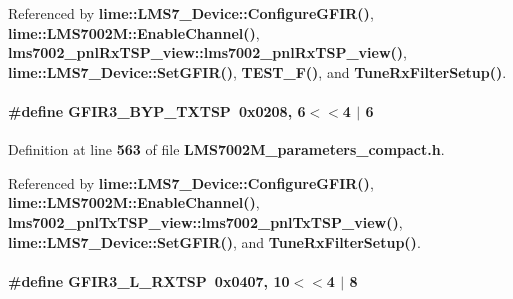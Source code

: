 Referenced by {\bf lime\+::\+L\+M\+S7\+\_\+\+Device\+::\+Configure\+G\+F\+I\+R()}, {\bf lime\+::\+L\+M\+S7002\+M\+::\+Enable\+Channel()}, {\bf lms7002\+\_\+pnl\+Rx\+T\+S\+P\+\_\+view\+::lms7002\+\_\+pnl\+Rx\+T\+S\+P\+\_\+view()}, {\bf lime\+::\+L\+M\+S7\+\_\+\+Device\+::\+Set\+G\+F\+I\+R()}, {\bf T\+E\+S\+T\+\_\+\+F()}, and {\bf Tune\+Rx\+Filter\+Setup()}.

\paragraph[{G\+F\+I\+R3\+\_\+\+B\+Y\+P\+\_\+\+T\+X\+T\+SP}]{\setlength{\rightskip}{0pt plus 5cm}\#define G\+F\+I\+R3\+\_\+\+B\+Y\+P\+\_\+\+T\+X\+T\+SP~0x0208, 6$<$$<$4 $\vert$  6}\label{LMS7002M__parameters__compact_8h_a7ed74a8da574ec9341faec31675d4859}


Definition at line {\bf 563} of file {\bf L\+M\+S7002\+M\+\_\+parameters\+\_\+compact.\+h}.



Referenced by {\bf lime\+::\+L\+M\+S7\+\_\+\+Device\+::\+Configure\+G\+F\+I\+R()}, {\bf lime\+::\+L\+M\+S7002\+M\+::\+Enable\+Channel()}, {\bf lms7002\+\_\+pnl\+Tx\+T\+S\+P\+\_\+view\+::lms7002\+\_\+pnl\+Tx\+T\+S\+P\+\_\+view()}, {\bf lime\+::\+L\+M\+S7\+\_\+\+Device\+::\+Set\+G\+F\+I\+R()}, and {\bf Tune\+Rx\+Filter\+Setup()}.

\paragraph[{G\+F\+I\+R3\+\_\+\+L\+\_\+\+R\+X\+T\+SP}]{\setlength{\rightskip}{0pt plus 5cm}\#define G\+F\+I\+R3\+\_\+\+L\+\_\+\+R\+X\+T\+SP~0x0407, 10$<$$<$4 $\vert$  8}\label{LMS7002M__parameters__compact_8h_a7eb75bf1014cbbdafdfc26cf09b1d100}


